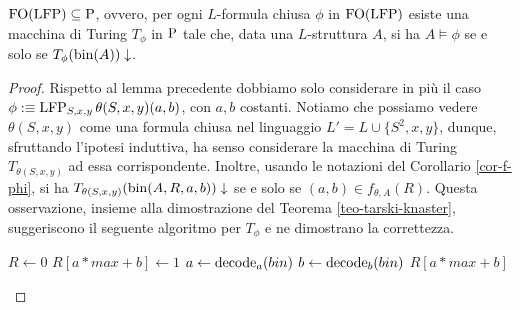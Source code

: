 \begin{proposizione}
\label{prop:FO(LFP)-subset-P}
 $\FO(\LFP) \subseteq \P$, ovvero, per ogni $L$-formula chiusa $\phi$ in $\FO(\LFP)$ esiste
 una macchina di Turing $T_\phi$ in $\P$ tale che, data una $L$-struttura $A$,
 si ha $A \models \phi$ se e solo se $T_\phi(\bin(A))\downarrow$.
\end{proposizione}
\begin{proof}
  Rispetto al lemma precedente dobbiamo solo considerare in più il caso
  $\phi :\equiv \LFP_{S,x,y}\theta(S,x,y)(a,b)$, con $a, b$ costanti.
  Notiamo che possiamo vedere
  $\theta(S,x,y)$ come una formula chiusa nel linguaggio $L'=L \cup \{S^2,x,y\}$,
  dunque, sfruttando l'ipotesi induttiva, ha senso considerare la macchina di
  Turing $T_{\theta(S,x,y)}$ ad essa
  corrispondente. Inoltre, usando le notazioni del Corollario \ref{cor-f-phi},
  si ha $T_{\theta(S,x,y)}(\bin(A,R,a,b))\downarrow$
  se e solo se $(a,b) \in f_{\theta,A}(R)$. Questa osservazione, insieme alla
  dimostrazione del Teorema \ref{teo-tarski-knaster}, suggeriscono il seguente
  algoritmo per $T_\phi$ e ne dimostrano la correttezza.
  
  \begin{algorithmic}
    \State $R\gets 0$
	\State $R[a*max + b] \gets 1$
      \EndIf
      \EndFor
    \EndFor
    \State $a \gets \decode_a (bin)$
    \State $b \gets \decode_b (bin)$
    \State \Return $R[a*max + b]$
  \EndFunction
  \end{algorithmic}
\end{proof}

